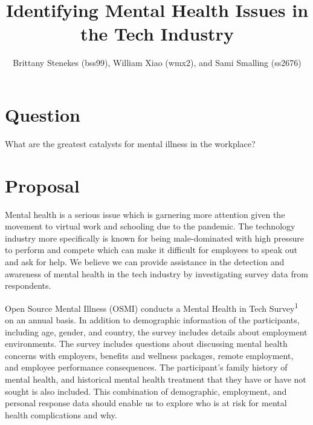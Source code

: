 \documentclass[notitlepage, 11pt]{report}
\begin{document}
\title{Identifying Mental Health Issues in the Tech Industry}
\author{Brittany Stenekes (bss99), William Xiao (wmx2), and Sami Smalling (ss2676)}
\date{}
\maketitle

\normalsize
\section{Question}
What are the greatest catalysts for mental illness in the workplace?

\section{Proposal}
Mental health is a serious issue which is garnering more attention given the 
movement to virtual work and schooling due to the pandemic. The technology 
industry more specifically is known for being male-dominated with high pressure 
to perform and compete which can make it difficult for employees to speak out
and ask for help. We believe we can provide assistance in the detection and 
awareness of mental health in the tech industry by investigating survey data 
from respondents. 

Open Source Mental Illness (OSMI) conducts a Mental Health in Tech 
Survey\textsuperscript{1} on an annual basis. In addition to demographic 
information of the participants, including age, gender, and country, the survey 
includes details about employment environments. The survey includes questions 
about discussing mental health concerns with employers, benefits and wellness 
packages, remote employment, and employee performance consequences. The 
participant’s family history of mental health, and historical mental health 
treatment that they have or have not sought is also included. This combination 
of demographic, employment, and personal response data should enable us to 
explore who is at risk for mental health complications and why. 
\end{document}
